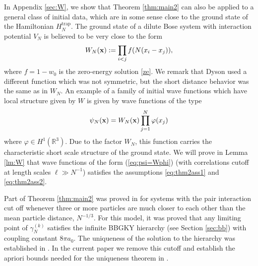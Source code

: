\documentclass[11pt]{article}
\newcommand{\be}{\begin{equation}}
\newcommand{\ee}{\end{equation}}
\newcommand{\Htrap}{H_N^{\text{trap}}}
\newcommand{\bx}{{\bf x}}
\newcommand{\ph}{\varphi}
\newcommand{\bR}{{\mathbb R}}
\begin{document}
In Appendix \ref{sec:W}, we show that Theorem \ref{thm:main2} can
also be applied to a general class of initial data, which are in
some sense close to the ground state of the Hamiltonian $\Htrap$.
 The ground state of a dilute Bose system with
interaction potential $V_N$ is believed to be very close to the form
\be\label{W}
 W_N (\bx) :=  \prod_{i<j} f(N(x_i-x_j)),
\ee where $f=1-w_0$ is the zero-energy solution \eqref{ze}. We
remark that Dyson \cite{Dy} used a different function which was not
symmetric, but the short distance behavior was the same as in $W_N$.
An example of a family of initial wave functions which have local
structure given by $W$ is given by wave functions of the type
\begin{equation}\label{eq:psi=Wphi}
\psi_N (\bx) = W_N (\bx) \prod_{j=1}^N \ph (x_j)
\end{equation}
where $\ph \in H^1 (\bR^3)$. Due to the factor $W_N$, this function
carries the characteristic short scale structure of the ground
state. We will prove in Lemma \ref{lm:W} that wave functions of the
form (\ref{eq:psi=Wphi}) (with correlations cutoff at length
scales $\ell \gg  N^{-1}$) satisfies the assumptions
\eqref{eq:thm2ass1} and \eqref{eq:thm2ass2}.

\medskip

Part of Theorem \ref{thm:main2} was proved in  \cite{ESY} for
systems with the pair interaction cut off whenever three or more
particles are much closer to each other than the mean particle
distance, $N^{-1/3}$. For this model, it was proved that any
limiting point of $\gamma_N^{(k)}$ satisfies the infinite BBGKY
hierarchy (see Section \ref{sec:bb}) with coupling constant $8\pi
a_0$. The uniqueness of the solution to the hierarchy was
established in \cite{ESY2}. In the current paper we remove this
cutoff and establish  the apriori bounds needed for the uniqueness
theorem in \cite{ESY2}.
\medskip
\end{document}
